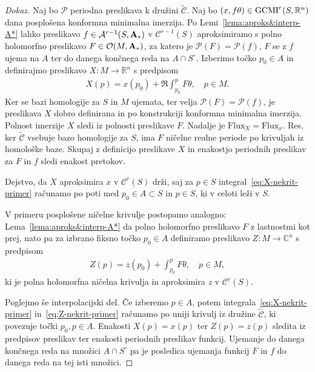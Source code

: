 \documentclass[12pt,a4paper,twoside]{article}
\theoremstyle{definition} %
\newenvironment{dokaz}[1][Dokaz]{\begin{proof}[#1]}{\end{proof}}
\theoremstyle{plain} %
\numberwithin{equation}{section}  %
\begin{document}
\begin{dokaz}
Naj bo $\mathcal{P}$ periodna preslikava k družini $\widetilde{\mathcal{C}}$. 
Naj bo $(x, f\theta) \in \textup{GCMI}^{r}(S, \mathbb{R}^{n})$ dana posplošena konformna minimalna imerzija. Po Lemi~\ref{lema:aproks&interp-A*} lahko preslikavo $f \in \mathcal{A}^{r-1}(S, \textup{\textbf{A}}_{*})$ v $\mathcal{C}^{r-1}(S)$ aproksimiramo s polno holomorfno preslikavo $F \in \mathcal{O}(M, \textup{\textbf{A}}_{*})$, za katero je $\mathcal{P}(F) = \mathcal{P}(f)$, $F$ se z $f$ ujema na $A$ ter do danega končnega reda na $A \cap S^{\circ}$.
Izberimo točko $p_0 \in A$ in definirajmo preslikavo $X \colon M \to \mathbb{R}^{n}$ s predpisom
\begin{gather} \label{eq:X-nekrit-primer}
X(p) = x(p_0) + \Re \int_{p_0}^{p} F\theta, \quad p \in M.
\end{gather}
Ker se bazi homologije za $S$ in $M$ ujemata, ter velja $\mathcal{P}(F) = \mathcal{P}(f)$, je preslikava $X$ dobro definirana in po konstrukciji konformna minimalna imerzija. 
Polnost imerzije $X$ sledi iz polnosti preslikave $F$.
Nadalje je $\text{Flux}_{X} = \text{Flux}_{x}$. Res, ker $\widetilde{\mathcal{C}}$ vsebuje bazo homologije za $S$, ima $F$ ničelne realne periode po krivuljah iz homološke baze. Skupaj z definicijo preslikave $X$ in enakostjo periodnih preslikav za $F$ in $f$ sledi enakost pretokov.

Dejstvo, da $X$ aproksimira $x$ v $\mathcal{C}^{r}(S)$ drži, saj za $p \in S$ integral~\eqref{eq:X-nekrit-primer} računamo po poti med $p_0 \in A \subset S$ in $p \in S$, ki v celoti leži v $S$.

V primeru posplošene ničelne krivulje postopamo analogno: Lema~\ref{lema:aproks&interp-A*} da polno holomorfno preslikavo $F$ z lastnostmi kot prej, nato pa za izbrano fiksno točko $p_0 \in A$ definiramo preslikavo $Z \colon M \to \mathbb{C}^{n}$ s predpisom
\begin{gather} \label{eq:Z-nekrit-primer}
Z(p) = z(p_0) + \int_{p_0}^{p} F\theta, \quad p \in M,
\end{gather}
ki je polna holomorfna ničelna krivulja in aproksimira $z$ v $\mathcal{C}^{r}(S)$.

Poglejmo še interpolacijski del.
Če izberemo $p \in A$, potem integrala~\eqref{eq:X-nekrit-primer} in~\eqref{eq:Z-nekrit-primer} računamo po uniji krivulj iz družine $\widetilde{\mathcal{C}}$, ki povezuje točki $p_0, p \in A$.
Enakosti $X(p) = x(p)$ ter $Z(p) = z(p)$ sledita iz predpisov preslikav ter enakosti periodnih preslikav funkcij.
Ujemanje do danega končnega reda na množici $A \cap S^{\circ}$ pa je posledica ujemanja funkcij $F$ in $f$ do danega reda na tej isti množici.
\end{dokaz}
\end{document}

